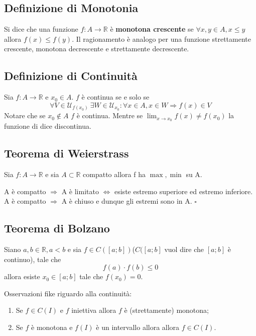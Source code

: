\documentclass{article}
\begin{document}
\subsection{Definizione di Monotonia}
Si dice che una funzione $f:A \rightarrow \mathbb{R}$ è \textbf{monotona crescente} se $\forall x,y \in A, x \leq y$ allora $f(x) \leq f(y).$
Il ragionamento è analogo per una funzione strettamente crescente, monotona decrescente e strettamente decrescente.

\subsection{Definizione di Continuità}
Sia $f:A\rightarrow\mathbb{R}$ e $x_0 \in A$. $f$ è continua se e solo se
\begin{equation*}
    \forall V \in \mathcal{U}_{f(x_0)} \ \exists W \in \mathcal{U}_{x_0}: \forall x \in A, x \in W \Rightarrow f(x) \in V
\end{equation*}
Notare che se $x_0 \notin A$ $f$ è continua. Mentre se $\lim_{x \to x_0}f(x)\neq f(x_0)$ la funzione di dice discontinua.

\subsection{\textbf{Teorema di Weierstrass}}\label{weierstrass}
Sia $f:A \rightarrow\mathbb{R}$ e sia $A \subset \mathbb{R}$ compatto allora f ha $\max, \min$ su A.
\begin{dimostrazione}
A è compatto $\Rightarrow$ A è limitato $\iff$ esiste estremo superiore ed estremo inferiore.\\
A è compatto $\Rightarrow$ A è chiuso e dunque gli estremi sono in A. $\square$
\end{dimostrazione}

\subsection{\textbf{Teorema di Bolzano}}\label{bolzano}
Siano $a,b \in \mathbb{R}, a < b$ e sia $f \in C([a;b])$($C([a;b]$ vuol dire che $[a;b]$ è continuo), tale che
\begin{equation*}
	f(a)\cdot f(b)\leq 0
\end{equation*}
allora esiste $x_0 \in [a;b]$ tale che $f(x_0)= 0$.

Osservazioni fike riguardo alla continuità:
\begin{enumerate}
	\item Se $f \in C(I)$ e $f$ iniettiva allora $f$ è (strettamente) monotona;
	\item Se $f$ è monotona e $f(I)$ è un intervallo allora allora $f \in C(I)$.
\end{enumerate}
\end{document}
